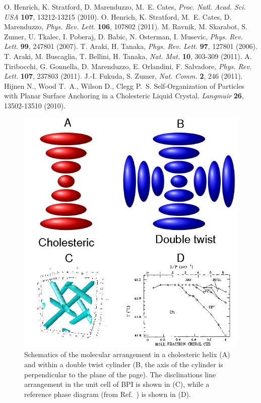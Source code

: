 \documentclass[12pt]{article}
\begin{document}
\begin{thebibliography}{99}
 O. Henrich, K. Stratford, D. Marenduzzo, M.~E. Cates,
{\it Proc. Natl. Acad. Sci. USA} {\bf 107}, 13212-13215 (2010).
 O. Henrich, K. Stratford, M.~E. Cates, D. Marenduzzo,
{\it Phys. Rev. Lett.} {\bf 106}, 107802 (2011).
 M. Ravnik, M. Skarabot, S. Zumer, U. Tkalec, I. Poberaj, D. Babic, N. Osterman, I. Musevic, {\it Phys. Rev. Lett.} {\bf 99}, 247801 (2007).
 T. Araki, H. Tanaka, {\it Phys. Rev. Lett.} {\bf 97}, 
127801 (2006).
 T. Araki, M. Buscaglia, T. Bellini, H. Tanaka,
{\it Nat. Mat.} {\bf 10}, 303-309 (2011).
 A. Tiribocchi, G. Gonnella, D. Marenduzzo, E. Orlandini,
F. Salvadore, {\it Phys. Rev. Lett.} {\bf 107}, 237803 (2011).
 J.-I. Fukuda, S. Zumer, {\it Nat. Comm.} {\bf 2}, 246 (2011).
 Hijnen N., Wood T.~A., Wilson D., Clegg P.~S. 
Self-Organization of Particles with Planar Surface Anchoring in a Cholesteric
 Liquid Crystal. {\it Langmuir} {\bf 26}, 13502-13510 (2010).
\end{thebibliography}

\newpage

\begin{figure}
\includegraphics[width=\textwidth]{s0.png}
\caption{Schematics of the molecular arrangement in a 
cholesteric helix (A) and within a double twist cylinder (B, the
axis of the cylinder is perpendicular to the plane of the page).
The disclinations line arrangement in the unit cell of BPI is shown in
(C), while a reference phase diagram (from Ref.~\cite{crooker}) is
shown in (D).}
\end{figure}
\end{document}
